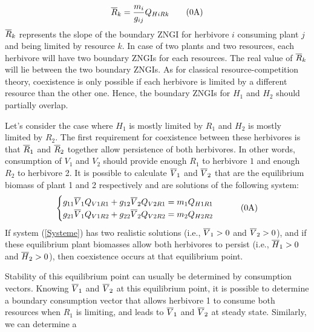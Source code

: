 \documentclass[12pt]{article}
\newcommand\barre[1]{\overline{\rule{0pt}{1.5ex}#1}}
\begin{document}
\begin{equation}
\barre{R}_k=\frac{m_i}{g_{ij}}Q_{HiRk} \tag{\theequation A}
\end{equation}
$\barre{R}_k$ represents the slope of the boundary ZNGI for herbivore $i$ consuming plant $j$ and being limited by resource $k$. In case of two plants and two resources, each herbivore will have two boundary ZNGIs for each resources. The real value of $\barre{R}_k$ will lie between the two boundary ZNGIs. As for classical resource-competition theory, coexistence is only possible if each herbivore is limited by a different resource than the other one. Hence, the boundary ZNGIs for $H_1$ and $H_2$ should partially overlap.   
\par
Let's consider the case where $H_1$ is mostly limited by $R_1$ and $H_2$ is mostly limited by $R_2$. The first requirement for coexistence between these herbivores is that $\barre{R}_1$ and $\barre{R}_2$ together allow persistence of both herbivores. In other words, consumption of $V_1$ and $V_2$ should provide enough $R_1$ to herbivore $1$ and enough $R_2$ to herbivore 2. It is possible to calculate $\barre{V}_1$ and $\barre{V}_2$ that are the equilibrium biomass of plant 1 and 2 respectively and are solutions of the following system:
\begin{equation} \label{Systeme}
\begin{cases}
g_{11}\barre{V}_1 Q_{V1R1}+g_{12}\barre{V}_2 Q_{V2R1}=m_1 Q_{H1R1} \\
g_{21}\barre{V}_1 Q_{V1R2}+g_{22}\barre{V}_2 Q_{V2R2}=m_2 Q_{H2R2}
\end{cases} \tag{\theequation A}
\end{equation}
If system (\ref{Systeme}) has two realistic solutions (i.e., $\barre{V}_1 > 0$ and $\barre{V}_2 > 0$), and if these equilibrium plant biomasses allow both herbivores to persist (i.e., $\barre{H}_1>0$ and $\barre{H}_2 >0$), %
then coexistence occurs at that equilibrium point. %
\par
Stability of this equilibrium point can usually be determined by consumption vectors. Knowing $\barre{V}_1$ and $\barre{V}_2$ at this equilibrium point, it is possible to determine a boundary consumption vector that %
allows herbivore 1 to consume both resources when $R_1$ is limiting, and leads to $\barre{V}_1$ and $\barre{V}_2$ at steady state. Similarly, we can determine a %
\end{document}
